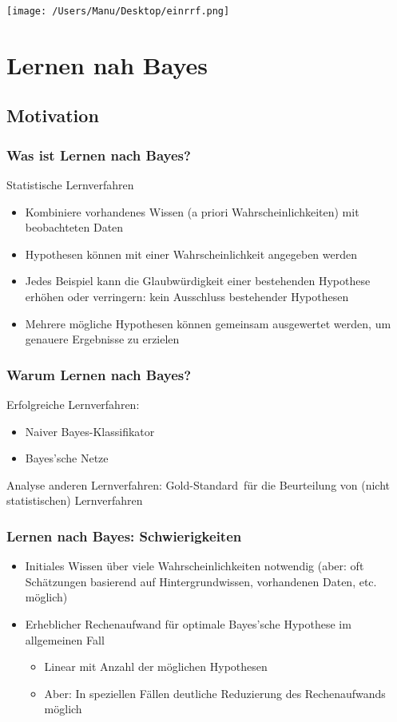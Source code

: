 \documentclass[paper=a4, fontsize=11pt]{scrartcl} %
\numberwithin{equation}{section} %
\numberwithin{figure}{section} %
\numberwithin{table}{section} %
\begin{document}
\texttt{[image: /Users/Manu/Desktop/einrrf.png]}

\section{Lernen nah Bayes}

\subsection{Motivation}

\subsubsection{Was ist Lernen nach Bayes?} 
Statistische Lernverfahren
\begin{itemize}
\item Kombiniere vorhandenes Wissen (a priori Wahrscheinlichkeiten) mit beobachteten Daten
\item Hypothesen können mit einer Wahrscheinlichkeit angegeben werden
\item Jedes Beispiel kann die Glaubwürdigkeit einer bestehenden Hypothese erhöhen oder verringern: kein Ausschluss bestehender Hypothesen
\item Mehrere mögliche Hypothesen können gemeinsam ausgewertet werden, um genauere Ergebnisse zu erzielen
\end{itemize}

\subsubsection{Warum Lernen nach Bayes?}

Erfolgreiche Lernverfahren:
\begin{itemize}
\item Naiver Bayes-Klassifikator
\item Bayes'sche Netze
\end{itemize}

Analyse anderen Lernverfahren: \glqq Gold-Standard\grqq\ für die Beurteilung von (nicht statistischen) Lernverfahren

\subsubsection{Lernen nach Bayes: Schwierigkeiten}

\begin{itemize}
\item Initiales Wissen über viele Wahrscheinlichkeiten notwendig (aber: oft Schätzungen basierend auf Hintergrundwissen, vorhandenen Daten, etc. möglich)
\item Erheblicher Rechenaufwand für optimale Bayes'sche Hypothese im allgemeinen Fall
\begin{itemize}
\item Linear mit Anzahl der möglichen Hypothesen
\item Aber: In speziellen Fällen deutliche Reduzierung des Rechenaufwands möglich
\end{itemize}
\end{itemize}
\end{document}
